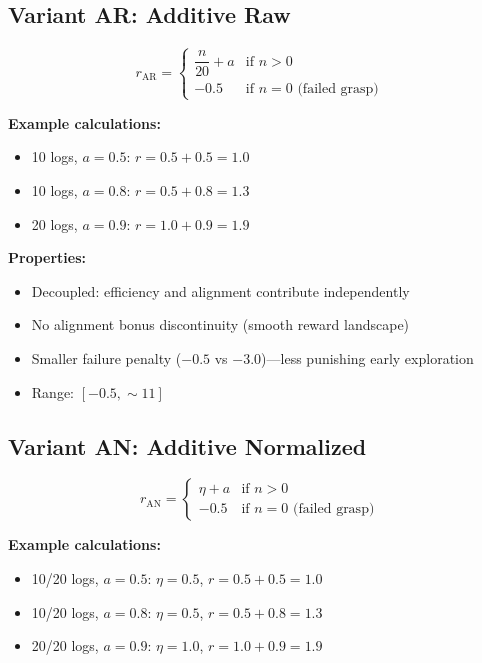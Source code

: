 \documentclass[11pt]{article}
\begin{document}
\subsection{Variant AR: Additive Raw}

\begin{equation}
    r_{\text{AR}} = \begin{cases}
        \dfrac{n}{20} + a & \text{if } n > 0 \\[8pt]
        -0.5 & \text{if } n = 0 \text{ (failed grasp)}
    \end{cases}
\end{equation}

\textbf{Example calculations:}
\begin{itemize}
    \item 10 logs, $a=0.5$: $r = 0.5 + 0.5 = 1.0$
    \item 10 logs, $a=0.8$: $r = 0.5 + 0.8 = 1.3$
    \item 20 logs, $a=0.9$: $r = 1.0 + 0.9 = 1.9$
\end{itemize}

\textbf{Properties:}
\begin{itemize}
    \item Decoupled: efficiency and alignment contribute independently
    \item No alignment bonus discontinuity (smooth reward landscape)
    \item Smaller failure penalty ($-0.5$ vs $-3.0$)---less punishing early exploration
    \item Range: $[-0.5, \sim 11]$
\end{itemize}

\subsection{Variant AN: Additive Normalized}

\begin{equation}
    r_{\text{AN}} = \begin{cases}
        \eta + a & \text{if } n > 0 \\
        -0.5 & \text{if } n = 0 \text{ (failed grasp)}
    \end{cases}
\end{equation}

\textbf{Example calculations:}
\begin{itemize}
    \item 10/20 logs, $a=0.5$: $\eta=0.5$, $r = 0.5 + 0.5 = 1.0$
    \item 10/20 logs, $a=0.8$: $\eta=0.5$, $r = 0.5 + 0.8 = 1.3$
    \item 20/20 logs, $a=0.9$: $\eta=1.0$, $r = 1.0 + 0.9 = 1.9$
\end{itemize}
\end{document}

